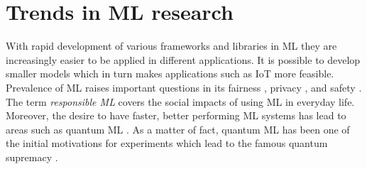 \section{Trends in ML research}
With rapid development of various frameworks and libraries in ML they are increasingly easier to be applied in different applications. It is possible to develop smaller models which in turn makes applications such as IoT \cite{iot_apps_conf} more feasible. 
Prevalence of ML raises important questions in its fairness \cite{FairML2018}, privacy \cite{Federated2019}, and safety \cite{Varshney2017}. The term \textit{responsible ML} covers the social impacts of using ML in everyday life.
Moreover, the desire to have faster, better performing ML systems has lead to areas such as quantum ML \cite{QuantumML2017}. As a matter of fact, quantum ML has been one of the initial motivations for experiments which lead to the famous quantum supremacy \cite{Quantum_sup}.
